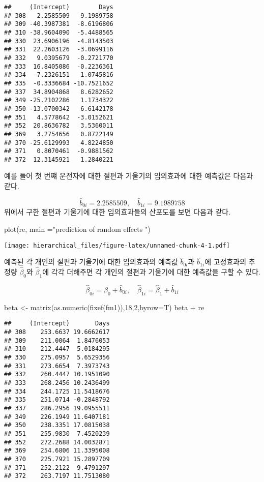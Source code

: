 \documentclass[
]{book}
\newenvironment{Shaded}{\begin{snugshade}}{\end{snugshade}}
\newcommand{\AttributeTok}[1]{\textcolor[rgb]{0.77,0.63,0.00}{#1}}
\newcommand{\DecValTok}[1]{\textcolor[rgb]{0.00,0.00,0.81}{#1}}
\newcommand{\FunctionTok}[1]{\textcolor[rgb]{0.00,0.00,0.00}{#1}}
\newcommand{\NormalTok}[1]{#1}
\newcommand{\OtherTok}[1]{\textcolor[rgb]{0.56,0.35,0.01}{#1}}
\newcommand{\SpecialCharTok}[1]{\textcolor[rgb]{0.00,0.00,0.00}{#1}}
\newcommand{\StringTok}[1]{\textcolor[rgb]{0.31,0.60,0.02}{#1}}
\begin{document}
\begin{verbatim}
##     (Intercept)        Days
## 308   2.2585509   9.1989758
## 309 -40.3987381  -8.6196806
## 310 -38.9604090  -5.4488565
## 330  23.6906196  -4.8143503
## 331  22.2603126  -3.0699116
## 332   9.0395679  -0.2721770
## 333  16.8405086  -0.2236361
## 334  -7.2326151   1.0745816
## 335  -0.3336684 -10.7521652
## 337  34.8904868   8.6282652
## 349 -25.2102286   1.1734322
## 350 -13.0700342   6.6142178
## 351   4.5778642  -3.0152621
## 352  20.8636782   3.5360011
## 369   3.2754656   0.8722149
## 370 -25.6129993   4.8224850
## 371   0.8070461  -0.9881562
## 372  12.3145921   1.2840221
\end{verbatim}

예를 들어 첫 번쨰 운전자에 대한 절편과 기울기의 임의효과에 대한 예측값은 다음과 같다.

\[ {\hat b}_{0i} = 2.2585509, \quad  {\hat b}_{1i} =   9.1989758 \]
위에서 구한 절편과 기울기에 대한 임의효과들의 산포도를 보면 다음과 같다.

\begin{Shaded}
\begin{Highlighting}[]
\FunctionTok{plot}\NormalTok{(re, }\AttributeTok{main =}\StringTok{"prediction of random effects "}\NormalTok{)}
\end{Highlighting}
\end{Shaded}

\texttt{[image: hierarchical\_files/figure-latex/unnamed-chunk-4-1.pdf]}

예측된 각 개인의 절편과 기울기에 대한 임의효과의 예측값 \({\hat b}_{0i}\)과 \({\hat b}_{1i}\)에 고정효과의 추정량 \(\hat \beta_0\)와 \(\hat \beta_1\)에 각각 더해주면 각 개인의 절편과 기울기에 대한 예측값을 구할 수 있다.

\[ {\hat \beta}_{0i} = \hat \beta_0 + {\hat b}_{0i} , \quad 
{\hat \beta}_{1i} = \hat \beta_1 + {\hat b}_{1i} \]

\begin{Shaded}
\begin{Highlighting}[]
\NormalTok{beta }\OtherTok{\textless{}{-}} \FunctionTok{matrix}\NormalTok{(}\FunctionTok{as.numeric}\NormalTok{(}\FunctionTok{fixef}\NormalTok{(fm1)),}\DecValTok{18}\NormalTok{,}\DecValTok{2}\NormalTok{,}\AttributeTok{byrow=}\NormalTok{T)}
\NormalTok{beta }\SpecialCharTok{+}\NormalTok{ re }
\end{Highlighting}
\end{Shaded}

\begin{verbatim}
##     (Intercept)       Days
## 308    253.6637 19.6662617
## 309    211.0064  1.8476053
## 310    212.4447  5.0184295
## 330    275.0957  5.6529356
## 331    273.6654  7.3973743
## 332    260.4447 10.1951090
## 333    268.2456 10.2436499
## 334    244.1725 11.5418676
## 335    251.0714 -0.2848792
## 337    286.2956 19.0955511
## 349    226.1949 11.6407181
## 350    238.3351 17.0815038
## 351    255.9830  7.4520239
## 352    272.2688 14.0032871
## 369    254.6806 11.3395008
## 370    225.7921 15.2897709
## 371    252.2122  9.4791297
## 372    263.7197 11.7513080
\end{verbatim}
\end{document}

